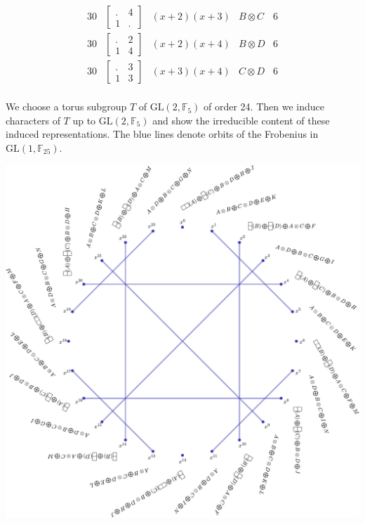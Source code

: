 \documentclass[11pt,oneside]{article}
\newcommand{\GL}{\mathrm{GL}}
\newcommand{\Field}{\mathbb{F}}
\newcommand{\tensor}{\otimes}
\begin{document}
$$\begin{array}{c|c|c|c|r}
30  &  \begin{bmatrix}.&4\\1&.\end{bmatrix}   & (x+2)(x+3)  & B\tensor C & 6  \\
30  &  \begin{bmatrix}.&2\\1&4\end{bmatrix}   & (x+2)(x+4)  & B\tensor D & 6  \\
30  &  \begin{bmatrix}.&3\\1&3\end{bmatrix}   & (x+3)(x+4)  & C\tensor D & 6  \\
\end{array}
$$

We choose a torus subgroup $T$ of $\GL(2,\Field_5)$ of order 24.
Then we induce characters of $T$ up to $\GL(2,\Field_5)$ and show the
irreducible content of these induced representations.
The blue lines denote orbits of the Frobenius in $\GL(1,\Field_{25})$.

\begin{center}
\includegraphics[scale=0.5]{images/cusp_24.pdf}
\end{center}
\end{document}
